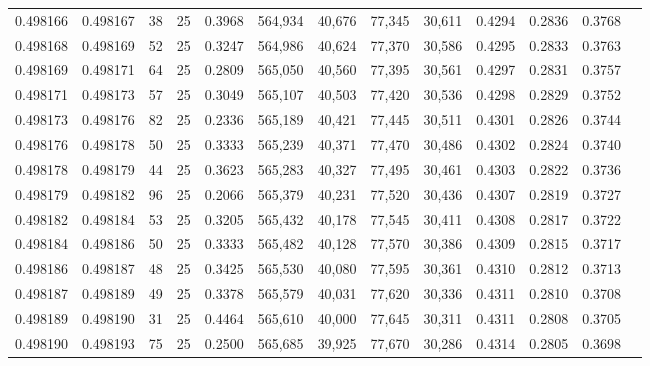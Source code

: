\begin{tabular}{rrrrrrrrrrrrr}
0.498166 & 0.498167 &    38 &  25 &                                     0.3968 & 564,934 &  40,676 &  77,345 &  30,611 & 0.4294 & 0.2836 & 0.3768 \\
0.498168 & 0.498169 &    52 &  25 &                                     0.3247 & 564,986 &  40,624 &  77,370 &  30,586 & 0.4295 & 0.2833 & 0.3763 \\
0.498169 & 0.498171 &    64 &  25 &                                     0.2809 & 565,050 &  40,560 &  77,395 &  30,561 & 0.4297 & 0.2831 & 0.3757 \\
0.498171 & 0.498173 &    57 &  25 &                                     0.3049 & 565,107 &  40,503 &  77,420 &  30,536 & 0.4298 & 0.2829 & 0.3752 \\
0.498173 & 0.498176 &    82 &  25 &                                     0.2336 & 565,189 &  40,421 &  77,445 &  30,511 & 0.4301 & 0.2826 & 0.3744 \\
0.498176 & 0.498178 &    50 &  25 &                                     0.3333 & 565,239 &  40,371 &  77,470 &  30,486 & 0.4302 & 0.2824 & 0.3740 \\
0.498178 & 0.498179 &    44 &  25 &                                     0.3623 & 565,283 &  40,327 &  77,495 &  30,461 & 0.4303 & 0.2822 & 0.3736 \\
0.498179 & 0.498182 &    96 &  25 &                                     0.2066 & 565,379 &  40,231 &  77,520 &  30,436 & 0.4307 & 0.2819 & 0.3727 \\
0.498182 & 0.498184 &    53 &  25 &                                     0.3205 & 565,432 &  40,178 &  77,545 &  30,411 & 0.4308 & 0.2817 & 0.3722 \\
0.498184 & 0.498186 &    50 &  25 &                                     0.3333 & 565,482 &  40,128 &  77,570 &  30,386 & 0.4309 & 0.2815 & 0.3717 \\
0.498186 & 0.498187 &    48 &  25 &                                     0.3425 & 565,530 &  40,080 &  77,595 &  30,361 & 0.4310 & 0.2812 & 0.3713 \\
0.498187 & 0.498189 &    49 &  25 &                                     0.3378 & 565,579 &  40,031 &  77,620 &  30,336 & 0.4311 & 0.2810 & 0.3708 \\
0.498189 & 0.498190 &    31 &  25 &                                     0.4464 & 565,610 &  40,000 &  77,645 &  30,311 & 0.4311 & 0.2808 & 0.3705 \\
0.498190 & 0.498193 &    75 &  25 &                                     0.2500 & 565,685 &  39,925 &  77,670 &  30,286 & 0.4314 & 0.2805 & 0.3698 \\

\end{tabular}

